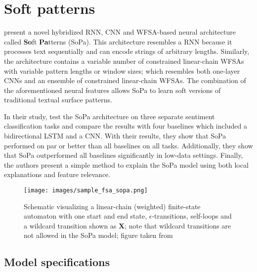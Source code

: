 \section{Soft patterns}

\label{section:soft-patterns}

\citet{schwartz2018sopa} present a novel hybridized RNN, CNN and WFSA-based neural architecture called \textbf{So}ft \textbf{Pa}tterns (SoPa). This architecture resembles a RNN because it processes text sequentially and can encode strings of arbitrary lengths. Similarly, the architecture contains a variable number of constrained linear-chain WFSAs with variable pattern lengths or window sizes; which resembles both one-layer CNNs and an ensemble of constrained linear-chain WFSAs. The combination of the aforementioned neural features allows SoPa to learn soft versions of traditional textual surface patterns.

In their study, \citet{schwartz2018sopa} test the SoPa architecture on three separate sentiment classification tasks and compare the results with four baselines which included a bidirectional LSTM and a CNN. With their results, they show that SoPa performed on par or better than all baselines on all tasks. Additionally, they show that SoPa outperformed all baselines significantly in low-data settings. Finally, the authors present a simple method to explain the SoPa model using both local explanations and feature relevance.

\begin{figure}[t]
  \centering
  \texttt{[image: images/sample\_fsa\_sopa.png]}
  \caption{Schematic visualizing a linear-chain (weighted) finite-state automaton with one start and end state, $\epsilon$-transitions, self-loops and a wildcard transition shown as \textbf{X}; note that wildcard transitions are not allowed in the SoPa model; figure taken from \citet{schwartz2018sopa}}
  \label{fig:fsa}
\end{figure}

\subsection{Model specifications}

